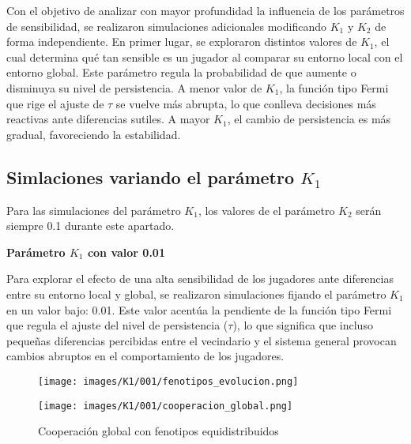 \documentclass[a4paper,12pt]{report}
\begin{document}
Con el objetivo de analizar con mayor profundidad la influencia de los parámetros de sensibilidad, se realizaron simulaciones adicionales modificando \( K_1 \) y \( K_2 \) de forma independiente. En primer lugar, se exploraron distintos valores de \( K_1 \), el cual determina qué tan sensible es un jugador al comparar su entorno local con el entorno global. Este parámetro regula la probabilidad de que aumente o disminuya su nivel de persistencia. A menor valor de \( K_1 \), la función tipo Fermi que rige el ajuste de \( \tau \) se vuelve más abrupta, lo que conlleva decisiones más reactivas ante diferencias sutiles. A mayor \( K_1 \), el cambio de persistencia es más gradual, favoreciendo la estabilidad.

\newpage

\subsection*{Simlaciones variando el parámetro \( K_1 \)}

Para las simulaciones del parámetro \( K_1 \), los valores de el parámetro \( K_2 \) serán siempre 0.1 durante este apartado.

\vspace{1.5em}
\noindent\textbf{Parámetro \( K_1\) con valor 0.01}
\vspace{0.5em}

Para explorar el efecto de una alta sensibilidad de los jugadores ante diferencias entre su entorno local y global, se realizaron simulaciones fijando el parámetro \( K_1 \) en un valor bajo: 0.01. Este valor acentúa la pendiente de la función tipo Fermi que regula el ajuste del nivel de persistencia (\( \tau \)), lo que significa que incluso pequeñas diferencias percibidas entre el vecindario y el sistema general provocan cambios abruptos en el comportamiento de los jugadores.


\begin{figure}[h!]
    \centering
    \begin{minipage}{0.49\textwidth}
    \centering
    \texttt{[image: images/K1/001/fenotipos\_evolucion.png]}
    \label{fig:enter-label}
    \end{minipage}
    \hfill
    \begin{minipage}{0.49\textwidth}
    \centering
    \texttt{[image: images/K1/001/cooperacion\_global.png]}
    \label{fig:enter-label}
    \end{minipage}
    \caption{Cooperación global con fenotipos equidistribuidos}
\end{figure}
\end{document}
